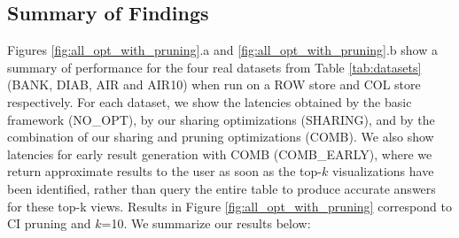 \subsection{Summary of Findings}
\label{sec:expt_summary}

Figures \ref{fig:all_opt_with_pruning}.a and \ref{fig:all_opt_with_pruning}.b show a summary of \SeeDB performance for the four real datasets from Table \ref{tab:datasets} (BANK, DIAB, AIR and AIR10) when run on a ROW store and COL store respectively.
For each dataset, we show the latencies obtained by the basic \SeeDB framework (NO\_OPT), by our sharing optimizations (SHARING), and by the combination of our sharing and pruning optimizations (COMB). 
We also show latencies for early result generation with COMB (COMB\_EARLY), where we return approximate results to the user as soon as the top-$k$ visualizations have been identified, rather than query the entire table to produce accurate answers for these top-k views.
Results in Figure \ref{fig:all_opt_with_pruning} correspond to CI pruning and $k$=10. We summarize our results below:




